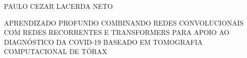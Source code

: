 


\cleardoublepage
\thispagestyle{empty}

\vspace{-60mm}

\begin{center}
   {\large PAULO CEZAR LACERDA NETO}\\
   \vspace{7mm}

   APRENDIZADO PROFUNDO COMBINANDO REDES CONVOLUCIONAIS COM REDES RECORRENTES E TRANSFORMERS PARA APOIO AO DIAGNÓSTICO DA COVID-19 BASEADO EM TOMOGRAFIA COMPUTACIONAL DE TÓRAX\\
  \vspace{10mm}
\end{center}

